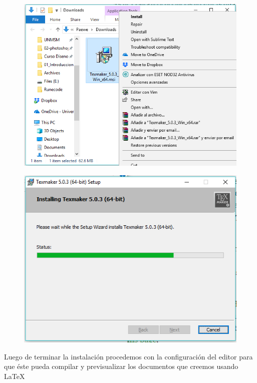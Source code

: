 \documentclass{article}
\begin{document}
\begin{figure}[h!]
  \centering
  \includegraphics[scale=0.75]{./imagenes/Install_takemaker2.png}
\end{figure}
\clearpage

\begin{figure}[h!]
  \centering
  \includegraphics[scale=0.75]{./imagenes/Install_takemaker3.png}
\end{figure}

Luego de terminar la instalación procedemos con la configuración del editor
para que éste pueda compilar y previsualizar los documentos que creemos usando
\LaTeX\\
\end{document}
